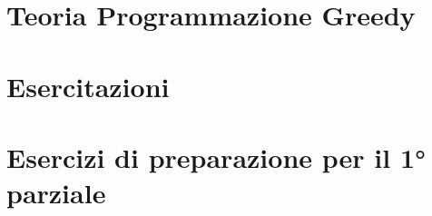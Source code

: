 \documentclass[a4paper,12pt]{report}
\begin{document}
    \part{Teoria Programmazione Greedy}
        
        
        
        
        
        
        

    \part{Esercitazioni}
        
        
        
        
    
    \part{Esercizi di preparazione per il 1° parziale}
\end{document}
